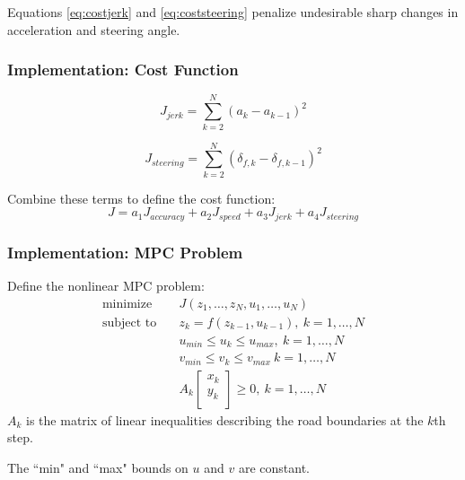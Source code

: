 \documentclass{beamer}
\begin{document}
\begin{frame}
Equations \eqref{eq:costjerk} and \eqref{eq:coststeering} penalize undesirable sharp changes in acceleration and steering angle.
\frametitle{Implementation: Cost Function}
\begin{equation}
J_{jerk} = \sum_{k=2}^N (a_k - a_{k-1})^2
\label{eq:costjerk}
\end{equation}

\begin{equation}
J_{steering} = \sum_{k=2}^N (\delta_{f,k} - \delta_{f,k-1})^2
\label{eq:coststeering}
\end{equation}

Combine these terms to define the cost function:
\begin{equation}
J = a_1 J_{accuracy} + a_2 J_{speed} + a_3 J_{jerk} + a_4 J_{steering}
\label{eq:costfinal}
\end{equation}
\end{frame}

\begin{frame}
\frametitle{Implementation: MPC Problem}
Define the nonlinear MPC problem:
\begin{align}
\text{minimize}\quad& J(z_1,\dots,z_N, u_1,\dots,u_N)
\\
\text{subject to} \quad& z_{k} = f(z_{k-1}, u_{k-1}),\ k=1,\dots,N
\\
& u_{min} \leq u_k \leq u_{max},\ k=1,\dots,N
\\
& v_{min}\leq
v_k\leq
v_{max}\ k=1,\dots,N
\\
&
A_k\begin{bmatrix}
x_k\\y_k\\
\end{bmatrix} \geq 0,\ k=1,\dots,N
\end{align}
$A_k$ is the matrix of linear inequalities describing the road boundaries at the $k$th step.

The ``min" and ``max" bounds on $u$ and $v$ are constant.
\end{frame}
\end{document}
